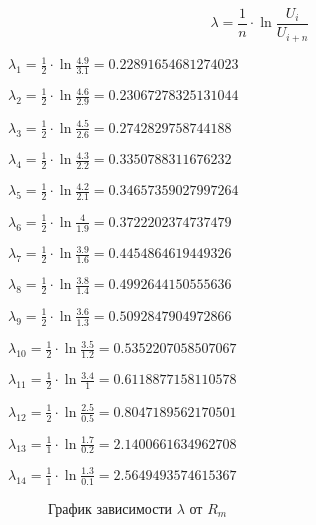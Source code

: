 \[
\lambda=\frac{1}{n}\cdot \ln\frac{U_i}{U_{i+n}}
\]

$\lambda_1=\frac{1}{2}\cdot \ln\frac{4.9}{3.1}=0.22891654681274023$

$\lambda_2=\frac{1}{2}\cdot \ln\frac{4.6}{2.9}=0.23067278325131044$

$\lambda_3=\frac{1}{2}\cdot \ln\frac{4.5}{2.6}=0.2742829758744188$

$\lambda_4=\frac{1}{2}\cdot \ln\frac{4.3}{2.2}=0.3350788311676232$

$\lambda_5=\frac{1}{2}\cdot \ln\frac{4.2}{2.1}=0.34657359027997264$

$\lambda_6=\frac{1}{2}\cdot \ln\frac{4}{1.9}=0.3722202374737479$

$\lambda_7=\frac{1}{2}\cdot \ln\frac{3.9}{1.6}=0.4454864619449326$

$\lambda_8=\frac{1}{2}\cdot \ln\frac{3.8}{1.4}=0.4992644150555636$

$\lambda_9=\frac{1}{2}\cdot \ln\frac{3.6}{1.3}=0.5092847904972866$

$\lambda_10=\frac{1}{2}\cdot \ln\frac{3.5}{1.2}=0.5352207058507067$

$\lambda_11=\frac{1}{2}\cdot \ln\frac{3.4}{1}=0.6118877158110578$

$\lambda_12=\frac{1}{2}\cdot \ln\frac{2.5}{0.5}=0.8047189562170501$

$\lambda_13=\frac{1}{1}\cdot \ln\frac{1.7}{0.2}=2.1400661634962708$

$\lambda_14=\frac{1}{1}\cdot \ln\frac{1.3}{0.1}=2.5649493574615367$


\begin{figure}[h]
	\centering
	\caption{График зависимости $\lambda$ от $R_m$}
\end{figure}
